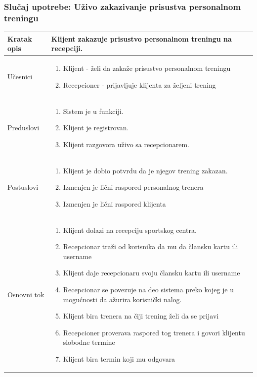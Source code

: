 \subsubsection{Slučaj upotrebe: Uživo zakazivanje prisustva personalnom treningu}

\begin{longtable}{| p{} | p{} |} 
\hline
    Kratak opis & Klijent zakazuje prisustvo personalnom treningu na recepciji. \\ 
\hline    
    Učesnici & 
    \begin{enumerate}
    \item Klijent - želi da zakaže prisustvo personalnom treningu
    \item Recepcioner - prijavljuje klijenta za željeni trening
   \end{enumerate}\\
\hline
   Preduslovi & \begin{enumerate}
    \item Sistem je u funkciji.
    \item Klijent je registrovan.
    \item Klijent razgovora uživo sa recepcionarem.
   \end{enumerate} \\
\hline  
    Postuslovi & \begin{enumerate}
    \item Klijent je dobio potvrdu da je njegov trening zakazan.
    \item Izmenjen je lični raspored personalnog trenera
    \item Izmenjen je lični raspored klijenta
   \end{enumerate} \\
\hline
    Osnovni tok & 
    \begin{enumerate}
    \item Klijent dolazi na recepciju sportskog centra.
    \item Recepcionar traži od korisnika da mu da člansku kartu ili username
    \item Klijent daje recepcionaru svoju člansku kartu ili username
    \item Recepcionar se povezuje na deo sistema preko kojeg je u mogućnosti da ažurira korisnički nalog.
    \item Klijent bira trenera na čiji trening želi da se prijavi
    \item Recepcioner proverava raspored tog trenera i govori klijentu slobodne termine
    \item Klijent bira termin koji mu odgovara

\end{enumerate}
\end{longtable}
